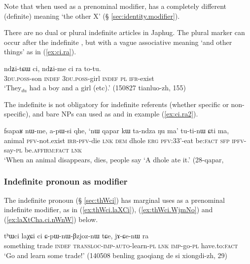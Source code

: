 Note that when used as a prenominal modifier,  has a completely different (definite) meaning `the other X' (§ \ref{sec:identity.modifier}). 

There are no dual or plural indefinite articles in Japhug. The plural marker  can occur after the indefinite , but with a vague associative meaning `and other things' as in (\ref{ex:ci.ra}).

\begin{exe}
\ex \label{ex:ci.ra}
 \gll  ndʑi-tɕɯ ci, ndʑi-me ci ra to-tu. \\
 \textsc{3du}.\textsc{poss}-son \textsc{indef}  \textsc{3du}.\textsc{poss}-girl \textsc{indef} \textsc{pl} \textsc{ifr}-exist \\
 \glt  `They$_{du}$ had a boy and a girl (etc).' (150827 tianluo-zh, 155)
\end{exe}

 The indefinite  is not obligatory for indefinite referents (whether specific or non-specific), and bare NPs can used as  and  in example (\ref{ex:ci.ra2}).
 

\begin{exe}
\ex \label{ex:ci.ra2}
 \gll  fsapaʁ nɯ-me, a-pɯ-si qhe, `nɯ qapar kɯ ta-ndza ŋu ma' tu-ti-nɯ ɕti ma, \\
 animal \textsc{pfv}-not.exist \textsc{irr}-\textsc{pfv}-die \textsc{lnk} \textsc{dem} dhole \textsc{erg} \textsc{pfv}:3\fl{}3'-eat be:\textsc{fact} \textsc{sfp} \textsc{ipfv}-say-\textsc{pl} be.\textsc{affirm}:\textsc{fact} \textsc{lnk}  \\
 \glt `When an animal disappears, dies, people say `A dhole ate it.' (28-qapar, 
\end{exe}


\subsubsection{Indefinite pronoun as modifier} \label{sec:indefinite}
The indefinite pronoun  (§ \ref{sec:thWci}) has marginal uses as a prenominal indefinite modifier, as in  (\ref{ex:thWci.laXCi}), (\ref{ex:thWci.WjmNo}) and (\ref{ex:laXtCha.ci.nWnW}) below. 

\begin{exe}
\ex \label{ex:thWci.laXCi}
\gll   tʰɯci laχɕi ci ɕ-pɯ-nɯ-βzjoz-nɯ tɕe, jɤ-ɕe-nɯ ra \\
something trade \textsc{indef} \textsc{transloc-imp-auto}-learn-\textsc{pl} \textsc{lnk} \textsc{imp}-go-\textsc{pl} have.to:\textsc{fact} \\
\glt `Go and learn some trade!' (140508 benling gaoqiang de si xiongdi-zh, 29)
 \end{exe}
 

